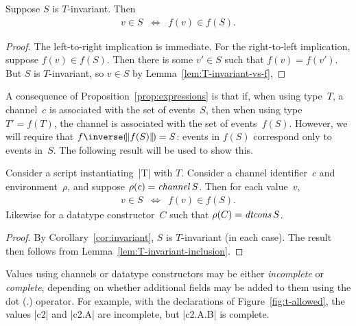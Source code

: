 %
\begin{lemma}
\label{lem:T-invariant-inclusion}
Suppose $S$ is $T$-invariant.  Then 
%
\begin{eqnarray*}
v \in S & \iff & f(v) \in f(S).
\end{eqnarray*}
\end{lemma}


\begin{proof}
The left-to-right implication is immediate.  For the right-to-left
implication, suppose $f(v) \in f(S)$.  Then there is some $v' \in S$ such that
$f(v) = f(v')$.  But $S$ is $T$-invariant, so $v \in S$ by
Lemma~\ref{lem:T-invariant-vs-f}, 
\end{proof}



A consequence of Proposition~\ref{prop:expressions} is that if, when using
type~$T$, a channel~$c$ is associated with the set of events~$S$, then when
using type $T' = f(T)$, the channel is associated with the set of
events~$f(S)$.  However, we will require that $f\inverse\banana{f(S)} = S$:
events in $f(S)$ correspond only to events in~$S$.  The following result will
be used to show this.
%
\begin{corollary}
\label{cor:channel-types}
Consider a script instantiating~|T| with $T$.  Consider a channel
identifier~$c$ and environment~$\rho$, and suppose $\rho(c) = \mathop{\it channel} S$.
Then for each value~$v$,
\begin{eqnarray*}
v \in S & \iff & f(v) \in f(S).
\end{eqnarray*}
%
Likewise for a datatype constructor~$C$ such that $\rho(C) = \mathop{\it dtcons} S$. 
\end{corollary}

\begin{proof}
By Corollary~\ref{cor:invariant}, $S$ is $T$-invariant (in each case).  The
result then follows from Lemma~\ref{lem:T-invariant-inclusion}.
\end{proof}


Values using channels or datatype constructors may be either \emph{incomplete}
or \emph{complete}, depending on whether additional fields may be added to
them using the dot ($.$) operator.  For example, with the declarations of
Figure~\ref{fig:t-allowed}, the values |c2| and |c2.A| are incomplete, but
|c2.A.B| is complete.

